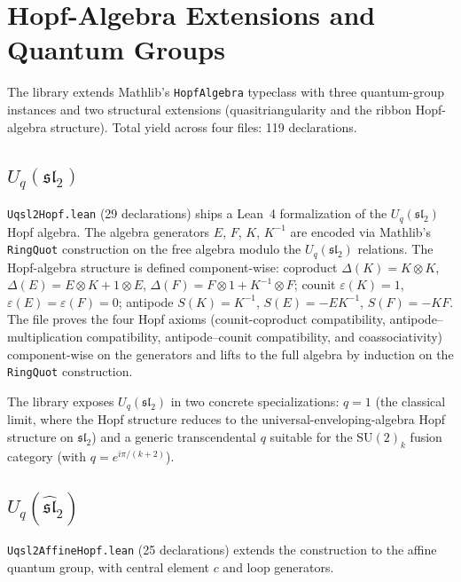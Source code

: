 \documentclass[11pt]{article}
\begin{document}

\section{Hopf-Algebra Extensions and Quantum Groups}
\label{sec:hopf}

The library extends Mathlib's \texttt{HopfAlgebra} typeclass with
three quantum-group instances and two structural extensions
(quasitriangularity and the ribbon Hopf-algebra structure). Total
yield across four files: 119 declarations.

\subsection{$U_q(\mathfrak{sl}_2)$}

\texttt{Uqsl2Hopf.lean} (29 declarations) ships a Lean~4
formalization of the $U_q(\mathfrak{sl}_2)$ Hopf algebra. The algebra
generators $E$, $F$, $K$, $K^{-1}$ are encoded via Mathlib's
\texttt{RingQuot} construction on the free algebra modulo the
$U_q(\mathfrak{sl}_2)$ relations. The Hopf-algebra structure is
defined component-wise: coproduct
$\Delta(K) = K \otimes K$, $\Delta(E) = E \otimes K + 1 \otimes E$,
$\Delta(F) = F \otimes 1 + K^{-1} \otimes F$; counit
$\varepsilon(K) = 1$, $\varepsilon(E) = \varepsilon(F) = 0$;
antipode $S(K) = K^{-1}$, $S(E) = -EK^{-1}$, $S(F) = -KF$. The
file proves the four Hopf axioms (counit-coproduct compatibility,
antipode--multiplication compatibility, antipode--counit
compatibility, and coassociativity) component-wise on the
generators and lifts to the full algebra by induction on the
\texttt{RingQuot} construction.

The library exposes $U_q(\mathfrak{sl}_2)$ in two concrete
specializations: $q = 1$ (the classical limit, where the Hopf
structure reduces to the universal-enveloping-algebra Hopf
structure on $\mathfrak{sl}_2$) and a generic transcendental $q$
suitable for the $\mathrm{SU}(2)_k$ fusion category (with
$q = e^{i\pi/(k+2)}$).

\subsection{$U_q(\widehat{\mathfrak{sl}}_2)$}

\texttt{Uqsl2AffineHopf.lean} (25 declarations) extends the
construction to the affine quantum group, with central element $c$
and loop generators.
\end{document}
